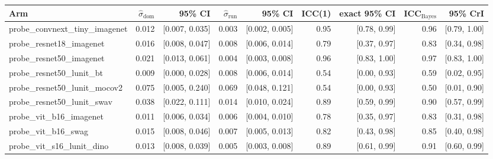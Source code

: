 \begin{tabular}{lrrrrrrrr}
\toprule
Arm & $\hat\sigma_\text{dom}$ & 95\% CI & $\hat\sigma_\text{run}$ & 95\% CI & ICC(1) & exact 95\% CI & ICC$_\text{Bayes}$ & 95\% CrI \\
\midrule
probe\_convnext\_tiny\_imagenet & 0.012 & [0.007, 0.035] & 0.003 & [0.002, 0.005] & 0.95 & [0.78, 0.99] & 0.96 & [0.79, 1.00] \\
probe\_resnet18\_imagenet & 0.016 & [0.008, 0.047] & 0.008 & [0.006, 0.014] & 0.79 & [0.37, 0.97] & 0.83 & [0.34, 0.98] \\
probe\_resnet50\_imagenet & 0.021 & [0.013, 0.061] & 0.004 & [0.003, 0.008] & 0.96 & [0.83, 1.00] & 0.97 & [0.83, 1.00] \\
probe\_resnet50\_lunit\_bt & 0.009 & [0.000, 0.028] & 0.008 & [0.006, 0.014] & 0.54 & [0.00, 0.93] & 0.59 & [0.02, 0.95] \\
probe\_resnet50\_lunit\_mocov2 & 0.075 & [0.005, 0.240] & 0.069 & [0.048, 0.121] & 0.54 & [0.00, 0.93] & 0.50 & [0.01, 0.90] \\
probe\_resnet50\_lunit\_swav & 0.038 & [0.022, 0.111] & 0.014 & [0.010, 0.024] & 0.89 & [0.59, 0.99] & 0.90 & [0.57, 0.99] \\
probe\_vit\_b16\_imagenet & 0.011 & [0.006, 0.034] & 0.006 & [0.004, 0.010] & 0.78 & [0.35, 0.97] & 0.83 & [0.31, 0.98] \\
probe\_vit\_b16\_swag & 0.015 & [0.008, 0.046] & 0.007 & [0.005, 0.013] & 0.82 & [0.43, 0.98] & 0.85 & [0.40, 0.98] \\
probe\_vit\_s16\_lunit\_dino & 0.013 & [0.008, 0.039] & 0.005 & [0.003, 0.008] & 0.89 & [0.61, 0.99] & 0.91 & [0.60, 0.99] \\
\bottomrule
\end{tabular}
